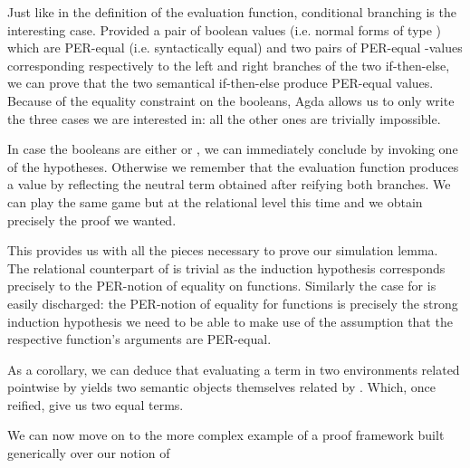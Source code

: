 
Just like in the definition of the evaluation function, conditional branching is the
interesting case. Provided a pair of boolean values (i.e. normal forms of type
) which are PER-equal (i.e. syntactically equal) and two pairs of PER-equal
-values corresponding respectively to the left and right branches of the two
if-then-else, we can prove that the two semantical if-then-else produce PER-equal values.
Because of the equality constraint on the booleans, Agda allows us to only write the
three cases we are interested in: all the other ones are trivially impossible.

In case the booleans are either  or , we can immediately conclude
by invoking one of the hypotheses. Otherwise we remember that the evaluation function
produces a value by reflecting the neutral term obtained after reifying both branches.
We can play the same game but at the relational level this time and we obtain precisely
the proof we wanted.


This provides us with all the pieces necessary to prove our simulation lemma. The relational
counterpart of  is trivial as the induction hypothesis corresponds precisely to
the PER-notion of equality on functions. Similarly the case for  is easily discharged:
the PER-notion of equality for functions is precisely the strong induction hypothesis we need
to be able to make use of the assumption that the respective function's arguments are PER-equal.


As a corollary, we can deduce that evaluating a term in two environments related pointwise
by  yields two semantic objects themselves related by . Which, once reified,
give us two equal terms.



We can now move on to the more complex example of a proof framework built generically
over our notion of 
